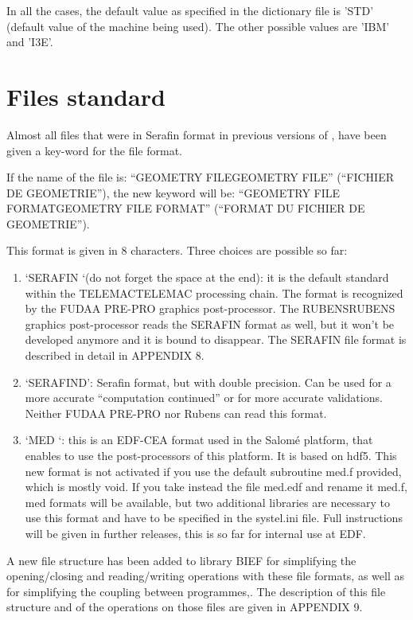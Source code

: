  In all the cases, the default value as specified in the dictionary file is 'STD' (default value of the machine being used). The other possible values are 'IBM' and 'I3E'.


\section{ Files standard}

 Almost all files that were in Serafin format in previous versions of \tomawac, have been given a key-word for the file format.

 If the name of the file is: ``GEOMETRY FILEGEOMETRY FILE'' (``FICHIER DE GEOMETRIE''), the new keyword will be: ``GEOMETRY FILE FORMATGEOMETRY FILE FORMAT'' (``FORMAT DU FICHIER DE GEOMETRIE'').

 This format is given in 8 characters. Three choices are possible so far:

\begin{enumerate}
\item  `SERAFIN `(do not forget the space at the end): it is the default standard within the TELEMACTELEMAC processing chain. The format is recognized by the FUDAA PRE-PRO graphics post-processor. The RUBENSRUBENS graphics post-processor reads the SERAFIN format as well, but it won't be developed anymore and it is bound to disappear. The SERAFIN file format is described in detail in APPENDIX 8.

\item  `SERAFIND': Serafin format, but with double precision. Can be used for a more accurate ``computation continued'' or for more accurate validations. Neither FUDAA PRE-PRO nor Rubens can read this format.

\item  `MED  `: this is an EDF-CEA format used in the Salomé platform, that enables to use the post-processors of this platform. It is based on hdf5. This new format is not activated if you use the default subroutine med.f provided, which is mostly void. If you take instead the file med.edf and rename it med.f, med formats will be available, but two additional libraries are necessary to use this format and have to be specified in the systel.ini file. Full instructions will be given in further releases, this is so far for internal use at EDF.
\end{enumerate}

 A new file structure has been added to library BIEF for simplifying the opening/closing and reading/writing operations with these file formats, as well as for simplifying the coupling between programmes,. The description of this file structure and of the operations on those files are given in APPENDIX 9.

